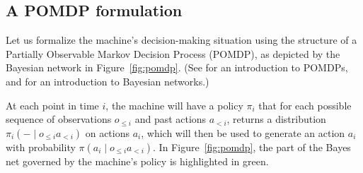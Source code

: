 \documentclass{article}  %
\newcommand{\hist}[1]{o_{\le #1}a_{<#1}}
\newcommand{\fig}[1]{Figure~\ref{fig:#1}}
\begin{document}
\subsection{A POMDP formulation}

Let us formalize the machine's decision-making situation using the structure of a Partially Observable Markov Decision Process (POMDP), as depicted by the Bayesian network in \fig{pomdp}.  (See \citet{russell2003artificial} for an introduction to POMDPs, and \citet{darwiche2009modeling} for an introduction to Bayesian networks.)

At each point in time $i$, the machine will have a policy $\pi_i$ that for each possible sequence of observations $o_{\le i}$ and past actions $a_{<i}$, returns a distribution $\pi_i(- \mid \hist i)$ on actions $a_i$, which will then be used to generate an action $a_i$ with probability $\pi(a_i \mid \hist i)$.  In \fig{pomdp}, the part of the Bayes net governed by the machine's policy is highlighted in green.

\begin{figure*}
\begin{center}
\end{center}
\caption{A POMDP of length $n=\lenn$}
\label{fig:pomdp}
\end{figure*}
\end{document}
